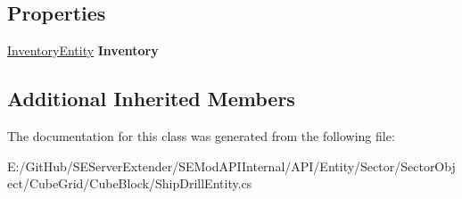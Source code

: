 \subsection*{Properties}
\begin{DoxyCompactItemize}
\item 
\hypertarget{class_s_e_mod_a_p_i_internal_1_1_a_p_i_1_1_entity_1_1_sector_1_1_sector_object_1_1_cube_grid_1_1d51c0ecece4b059e03822a2f6c969595_a4aa20dbee07409638faf503cb71d61d8}{}\hyperlink{class_s_e_mod_a_p_i_internal_1_1_a_p_i_1_1_entity_1_1_inventory_entity}{Inventory\+Entity} {\bfseries Inventory}\label{class_s_e_mod_a_p_i_internal_1_1_a_p_i_1_1_entity_1_1_sector_1_1_sector_object_1_1_cube_grid_1_1d51c0ecece4b059e03822a2f6c969595_a4aa20dbee07409638faf503cb71d61d8}

\end{DoxyCompactItemize}
\subsection*{Additional Inherited Members}


The documentation for this class was generated from the following file\+:\begin{DoxyCompactItemize}
\item 
E\+:/\+Git\+Hub/\+S\+E\+Server\+Extender/\+S\+E\+Mod\+A\+P\+I\+Internal/\+A\+P\+I/\+Entity/\+Sector/\+Sector\+Object/\+Cube\+Grid/\+Cube\+Block/Ship\+Drill\+Entity.\+cs\end{DoxyCompactItemize}
